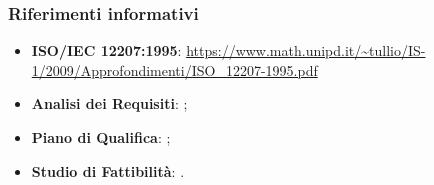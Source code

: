 	\subsubsection{Riferimenti informativi}
	\begin{itemize}
		\item \textbf{ISO/IEC 12207:1995}: \url{https://www.math.unipd.it/~tullio/IS-1/2009/Approfondimenti/ISO_12207-1995.pdf}
		\item \textbf{Analisi dei Requisiti}: ;
		\item \textbf{Piano di Qualifica}: ;
		\item \textbf{Studio di Fattibilità}: .
	\end{itemize}
